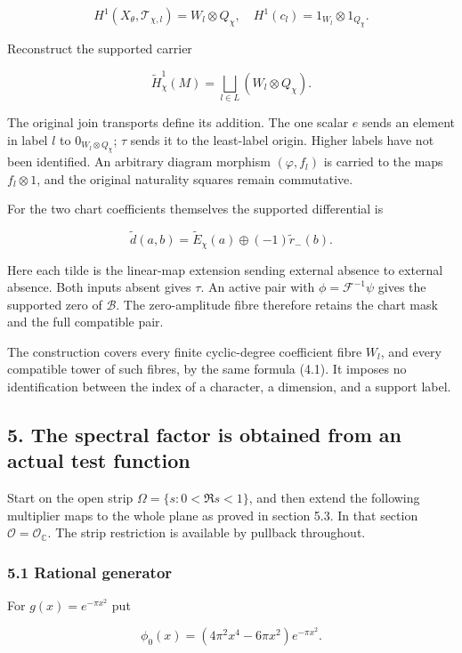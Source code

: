 \documentclass[
]{article}
\begin{document}
\[
H^1(X_\theta,\mathcal T_{\chi,l})=W_l\otimes Q_\chi,
\quad H^1(c_l)=1_{W_l}\otimes1_{Q_\chi}. \tag{4.1}
\]

Reconstruct the supported carrier

\[
\widetilde H^1_\chi(M)=\bigsqcup_{l\in L}(W_l\otimes Q_\chi).
\]

The original join transports define its addition. The one scalar \(e\)
sends an element in label \(l\) to \(0_{W_l\otimes Q_\chi}\); \(\tau\)
sends it to the least-label origin. Higher labels have not been
identified. An arbitrary diagram morphism \((\varphi,f_l)\) is carried
to the maps \(f_l\otimes1\), and the original naturality squares remain
commutative.

For the two chart coefficients themselves the supported differential is

\[
\widetilde d(a,b)=\widetilde E_\chi(a)\oplus(-1)\widetilde r_-(b).
\]

Here each tilde is the linear-map extension sending external absence to
external absence. Both inputs absent gives \(\tau\). An active pair with
\(\phi=\mathcal F^{-1}\psi\) gives the supported zero of \(\mathscr B\).
The zero-amplitude fibre therefore retains the chart mask and the full
compatible pair.

The construction covers every finite cyclic-degree coefficient fibre
\(W_l\), and every compatible tower of such fibres, by the same formula
(4.1). It imposes no identification between the index of a character, a
dimension, and a support label.

\subsection{5. The spectral factor is obtained from an actual test
function}\label{the-spectral-factor-is-obtained-from-an-actual-test-function}

Start on the open strip \(\Omega=\{s:0<\Re s<1\}\), and then extend the
following multiplier maps to the whole plane as proved in section 5.3.
In that section \(\mathcal O=\mathcal O_{\mathbb C}\). The strip
restriction is available by pullback throughout.

\subsubsection{5.1 Rational generator}\label{rational-generator}

For \(g(x)=e^{-\pi x^2}\) put

\[
\phi_0(x)=(4\pi^2x^4-6\pi x^2)e^{-\pi x^2}.
\]
\end{document}
